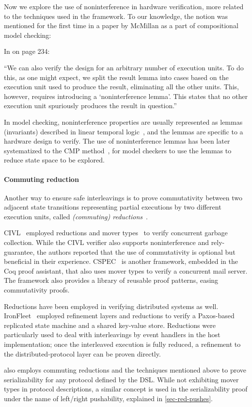 Now we explore the use of noninterference in hardware verification, more related to the techniques used in the \hemiola{} framework.
To our knowledge, the notion was mentioned for the first time in a paper by McMillan as a part of compositional model checking:
\begin{displayquote}
  In \cite{McMillan:1999} on page 234:

  ``We can also verify the design for an arbitrary number of execution units.
  To do this, as one might expect, we split the result lemma into cases based on the execution unit used to produce the result, eliminating all the other units.
  This, however, requires introducing a `noninterference lemma'.
  This states that no other execution unit spuriously produces the result in question.''
\end{displayquote}
In model checking, noninterference properties are usually represented as lemmas (invariants) described in linear temporal logic~\cite{licsBook}, and the lemmas are specific to a hardware design to verify.
The use of noninterference lemmas has been later systematized to the CMP method~\cite{McMillan:1999,McMillan:2001,Chou:2004}, for model checkers to use the lemmas to reduce state space to be explored.

\paragraph{Commuting reduction}

Another way to ensure safe interleavings is to prove commutativity between two adjacent state transitions representing partial executions by two different execution units, called \emph{(commuting) reductions}~\cite{reduction}.

CIVL~\cite{Hawblitzel:2015} employed reductions and mover types~\cite{Flanagan:2008} to verify concurrent garbage collection.
While the CIVL verifier also supports noninterference and rely-guarantee, the authors reported that the use of commutativity is optional but beneficial in their experience.
CSPEC~\cite{Chajed:2018} is another framework, embedded in the Coq proof assistant, that also uses mover types to verify a concurrent mail server.
The framework also provides a library of reusable proof patterns, easing commutativity proofs.

Reductions have been employed in verifying distributed systems as well.
IronFleet~\cite{Hawblitzel:2017} employed refinement layers and reductions to verify a Paxos-based~\cite{Paxos} replicated state machine and a shared key-value store.
Reductions were particularly used to deal with interleavings by event handlers in the host implementation; once the interleaved execution is fully reduced, a refinement to the distributed-protocol layer can be proven directly.

\hemiola{} also employs commuting reductions and the techniques mentioned above to prove serializability for any protocol defined by the \hemiola{} DSL.
While not exhibiting mover types in protocol descriptions, a similar concept is used in the serializability proof under the name of left/right pushability, explained in \autoref{sec-red-pushes}.
